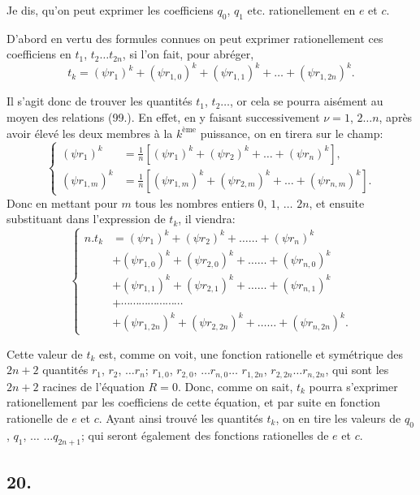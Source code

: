 \documentclass{article}
\begin{document}
Je dis, qu'on peut exprimer les coefficiens $q_{0}$, $q_{1}$ etc. rationellement en $e$ et $c$.

D'abord en vertu des formules connues on peut exprimer rationellement ces coefficiens en $t_{1}$, $t_{2}\ldots t_{2n}$, si l'on fait, pour abréger,
\[ t_{k}=(\psi r_{1})^{k}+(\psi r_{1,0})^{k}+(\psi r_{1,1})^{k}+\ldots+(\psi r_{1,2n})^{k}. \tag{101.} \]

Il s'agit donc de trouver les quantités $t_{1}$, $t_{2}\ldots$, or cela se pourra aisément au moyen des relations (99.). En effet, en y faisant successivement $\nu=1$, $2\ldots n$, après avoir élevé les deux membres à la $k^{\text{ème}}$ puissance, on en tirera sur le champ:
\[ \left\{\begin{aligned}
(\psi r_{1})^{k}&=\frac{1}{n}\left[(\psi r_{1})^{k}+(\psi r_{2})^{k}+\ldots+(\psi r_{n})^{k}\right],\\
(\psi r_{1,m})^{k}&=\frac{1}{n}\left[(\psi r_{1,m})^{k}+(\psi r_{2,m})^{k}+\ldots+(\psi r_{n,m})^{k}\right].
\end{aligned}\right. \tag{102.} \]
Donc en mettant pour $m$ tous les nombres entiers $0$, $1$, $\ldots$ $2n$, et ensuite substituant dans l'expression de $t_{k}$, il viendra:
\[ \left\{\begin{aligned}
n.t_{k}&=(\psi r_{1})^{k}+(\psi r_{2})^{k}+\ldots\ldots+(\psi r_{n})^{k}\\
&+(\psi r_{1,0})^{k}+(\psi r_{2,0})^{k}+\ldots\ldots+(\psi r_{n,0})^{k}\\
&+(\psi r_{1,1})^{k}+(\psi r_{2,1})^{k}+\ldots\ldots+(\psi r_{n,1})^{k}\\
&+\cdots\cdots\cdots\cdots\cdots\cdots\cdots\\
&+(\psi r_{1,2n})^{k}+(\psi r_{2,2n})^{k}+\ldots\ldots+(\psi r_{n,2n})^{k}.
\end{aligned}\right. \tag{103.} \]

Cette valeur de $t_{k}$ est, comme on voit, une fonction rationelle et symétrique des $2n+2$ quantités $r_{1}$, $r_{2}$, $\ldots r_{n}$; $r_{1,0}$, $r_{2,0}$, $\ldots r_{n,0}\ldots$ $r_{1,2n}$, $r_{2,2n}\ldots r_{n,2n}$, qui sont les $2n+2$ racines de l'équation $R=0$. Donc, comme on sait, $t_{k}$ pourra s'exprimer rationellement par les coefficiens de cette équation, et par suite en fonction rationelle de $e$ et $c$. Ayant ainsi trouvé les quantités $t_{k}$, on en tire les valeurs de $q_{0}$, $q_{1}$, $\ldots$ $\ldots q_{2n+1}$; qui seront également des fonctions rationelles de $e$ et $c$.

\subsection*{20.}
\end{document}
